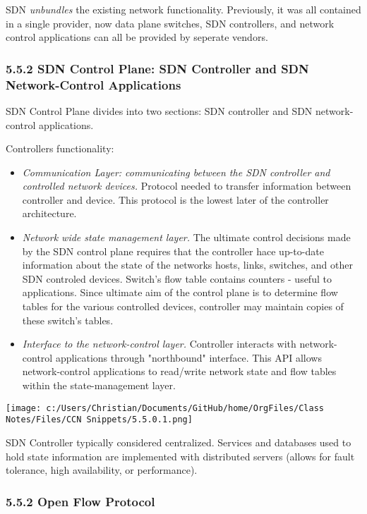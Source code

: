 \documentclass[11pt]{article}
\begin{document}
SDN \emph{unbundles} the existing network functionality. Previously, it was all contained in a single provider, now data plane switches, SDN controllers, and network control applications can all be provided by seperate vendors. 

\subsubsection{5.5.2 SDN Control Plane: SDN Controller and SDN Network-Control Applications}
\label{sec:org3ecbba6}

SDN Control Plane divides into two sections:
SDN controller and SDN network-control applications.

Controllers functionality:
\begin{itemize}
\item \emph{Communication Layer: communicating between the SDN controller and controlled network devices.} Protocol needed to transfer information between controller and device. This protocol is the lowest later of the controller architecture.
\item \emph{Network wide state management layer.} The ultimate control decisions made by the SDN control plane requires that the controller hace up-to-date information about the state of the networks hosts, links, switches, and other SDN controled devices. Switch's flow table contains counters - useful to applications. Since ultimate aim of the control plane is to determine flow tables for the various controlled devices, controller may maintain copies of these switch's tables.
\item \emph{Interface to the network-control layer.} Controller interacts with network-control applications through "northbound" interface. This API allows network-control applications to read/write network state and flow tables within the state-management layer.
\end{itemize}
\begin{center}
\texttt{[image: c:/Users/Christian/Documents/GitHub/home/OrgFiles/Class Notes/Files/CCN Snippets/5.5.0.1.png]}
\end{center}

SDN Controller typically considered centralized. Services and databases used to hold state information are implemented with distributed servers (allows for fault tolerance, high availability, or performance). 

\subsubsection{5.5.2 Open Flow Protocol}
\label{sec:orgee756cb}
\end{document}

